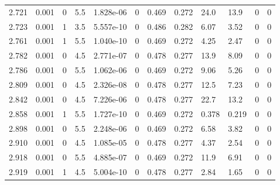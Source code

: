 \documentclass[preview]{standalone}
\begin{document}
{{{{{\begin{tabular}{L{1.2cm}C{1.2cm} C{0.3cm}C{0.5cm} C{1.4cm}C{1.4cm} C{1.4cm}C{1.4cm} C{1.6cm}C{1.6cm} C{1.6cm}C{1.6cm}}
  2.721  &  0.001  & 0     & 5.5 &  1.828e-06  & 0  &  0.469&   0.272& 24.0 & 13.9   &  0 & 0  \\ 
  2.723  &  0.001  & 1     & 3.5 &  5.557e-10  & 0  &  0.486&   0.282& 6.07 & 3.52   &  0 & 0  \\ 
  2.761  &  0.001  & 1     & 5.5 &  1.040e-10  & 0  &  0.469&   0.272& 4.25 & 2.47   &  0 & 0  \\ 
  2.782  &  0.001  & 0     & 4.5 &  2.771e-07  & 0  &  0.478&   0.277& 13.9 & 8.09   &  0 & 0  \\ 
  2.786  &  0.001  & 0     & 5.5 &  1.062e-06  & 0  &  0.469&   0.272& 9.06 & 5.26   &  0 & 0  \\ 
  2.809  &  0.001  & 0     & 4.5 &  2.326e-08  & 0  &  0.478&   0.277& 12.5 & 7.23   &  0 & 0  \\ 
  2.842  &  0.001  & 0     & 4.5 &  7.226e-06  & 0  &  0.478&   0.277& 22.7 & 13.2   &  0 & 0  \\ 
  2.858  &  0.001  & 1     & 5.5 &  1.727e-10  & 0  &  0.469&   0.272& 0.378 & 0.219   &  0 & 0  \\ 
  2.898  &  0.001  & 0     & 5.5 &  2.248e-06  & 0  &  0.469&   0.272& 6.58 & 3.82   &  0 & 0  \\ 
  2.910  &  0.001  & 0     & 4.5 &  1.085e-05  & 0  &  0.478&   0.277& 4.37 & 2.54   &  0 & 0  \\ 
  2.918  &  0.001  & 0     & 5.5 &  4.885e-07  & 0  &  0.469&   0.272& 11.9 & 6.91   &  0 & 0  \\ 
  2.919  &  0.001  & 1     & 4.5 &  5.004e-10  & 0  &  0.478&   0.277& 2.84 & 1.65   &  0 & 0  \\ 
\hline 
\end{tabular} 

}}}}}
\end{document}
